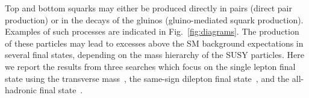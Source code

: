 Top and bottom squarks may either be produced directly in pairs
(direct pair production) or in the decays of the gluinos (gluino-mediated squark production). 
Examples of such processes are indicated in Fig.~\ref{fig:diagrams}.
The production of these particles may lead to excesses above the SM background expectations in several final states, 
depending on the mass hierarchy of the SUSY particles.
Here we report the results from three searches which focus on the single lepton final state using the transverse
mass~\cite{ref:stop}, the same-sign dilepton final state~\cite{ref:ss}, and the all-hadronic final state~\cite{ref:alphat}.

